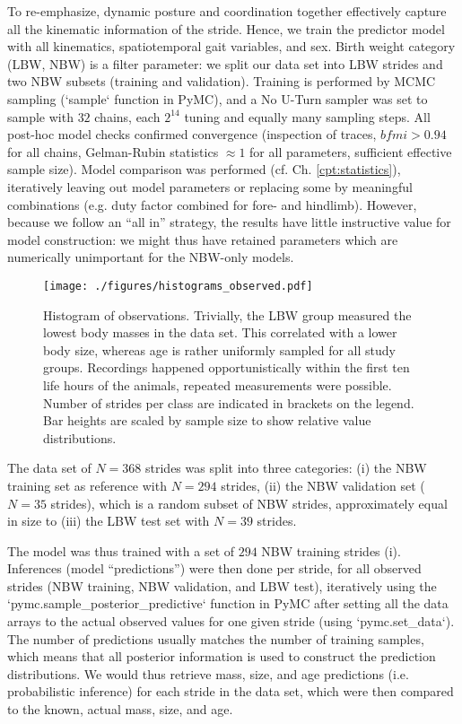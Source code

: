 To re-emphasize, dynamic posture and coordination together effectively capture all the kinematic information of the stride.
Hence, we train the predictor model with all kinematics, spatiotemporal gait variables, and sex.
Birth weight category (LBW, NBW) is a filter parameter: we split our data set into LBW strides and two NBW subsets (training and validation).
Training is performed by MCMC sampling (`sample` function in PyMC), and a No U-Turn sampler was set to sample with \(32\) chains, each \(2^{14}\) tuning and equally many sampling steps.
All post-hoc model checks confirmed convergence (inspection of traces, \(bfmi>0.94\) for all chains, Gelman-Rubin statistics \(\approx 1\) for all parameters, sufficient effective sample size).
Model comparison was performed (cf. Ch. \ref{cpt:statistics}), iteratively leaving out model parameters or replacing some by meaningful combinations (e.g. duty factor combined for fore- and hindlimb).
However, because we follow an ``all in'' strategy, the results have little instructive value for model construction: we might thus have retained parameters which are numerically unimportant for the NBW-only models.



\begin{figure}[t]
\centering
\texttt{[image: ./figures/histograms\_observed.pdf]}
\caption{\label{fig:observations}Histogram of observations. Trivially, the LBW group measured the lowest body masses in the data set. This correlated with a lower body size, whereas age is rather uniformly sampled for all study groups. Recordings happened opportunistically within the first ten life hours of the animals, repeated measurements were possible. Number of strides per class are indicated in brackets on the legend. Bar heights are scaled by sample size to show relative value distributions.}
\end{figure}


The data set of \(N = 368\) strides was split into three categories:
(i) the NBW training set as reference with \(N = 294\) strides,
(ii) the NBW validation set (\(N = 35\) strides), which is a random subset of NBW strides, approximately equal in size to
(iii) the LBW test set with \(N = 39\) strides.

The model was thus trained with a set of \(294\) NBW training strides (i).
Inferences (model ``predictions'') were then done per stride, for all observed strides (NBW training, NBW validation, and LBW test), iteratively using the `pymc.sample\_posterior\_predictive` function in PyMC after setting all the data arrays to the actual observed values for one given stride (using `pymc.set\_data`).
The number of predictions usually matches the number of training samples, which means that all posterior information is used to construct the prediction distributions.
We would thus retrieve mass, size, and age predictions (i.e. probabilistic inference) for each stride in the data set, which were then compared to the known, actual mass, size, and age.


